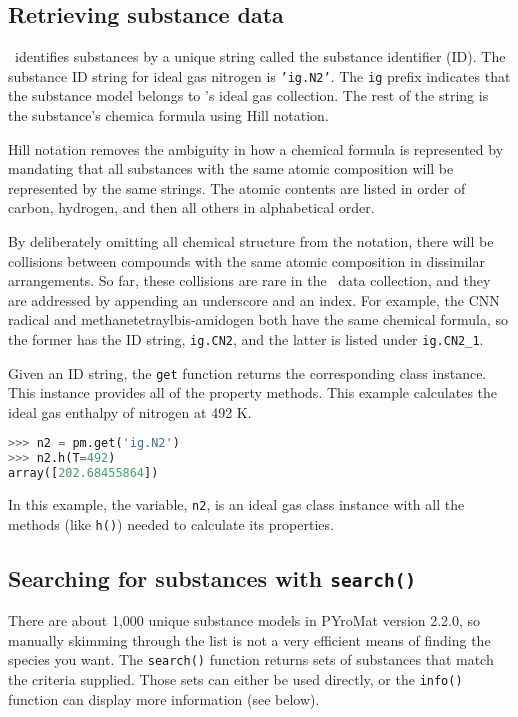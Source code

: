 \subsection{Retrieving substance data}

\PM\ identifies substances by a unique string called the substance identifier (ID).  The substance ID string for ideal gas nitrogen is \texttt{'ig.N2'}.  The \texttt{ig} prefix indicates that the substance model belongs to \PM's ideal gas collection.  The rest of the string is the substance's chemica formula using Hill notation.  

Hill notation removes the ambiguity in how a chemical formula is represented by mandating that all substances with the same atomic composition will be represented by the same strings.  The atomic contents are listed in order of carbon, hydrogen, and then all others in alphabetical order.

By deliberately omitting all chemical structure from the notation, there will be collisions between compounds with the same atomic composition in dissimilar arrangements.  So far, these collisions are rare in the \PM\ data collection, and they are addressed by appending an underscore and an index.  For example, the CNN radical and methanetetraylbis-amidogen both have the same chemical formula, so the former has the ID string, \texttt{ig.CN2}, and the latter is listed under \verb|ig.CN2_1|.

Given an ID string, the \texttt{get} function returns the corresponding class instance.  This instance provides all of the property methods.  This example calculates the ideal gas enthalpy of nitrogen at 492 K.
\begin{lstlisting}[language=Python]
>>> n2 = pm.get('ig.N2')
>>> n2.h(T=492)
array([202.68455864])
\end{lstlisting}

In this example, the variable, \texttt{n2}, is an ideal gas class instance with all the methods (like \texttt{h()}) needed to calculate its properties.


\subsection{Searching for substances with \texttt{search()}}

There are about 1,000 unique substance models in PYroMat version 2.2.0, so manually skimming through the list is not a very efficient means of finding the species you want.  The \texttt{search()} function returns sets of substances that match the criteria supplied.  Those sets can either be used directly, or the \texttt{info()} function can display more information (see below).


